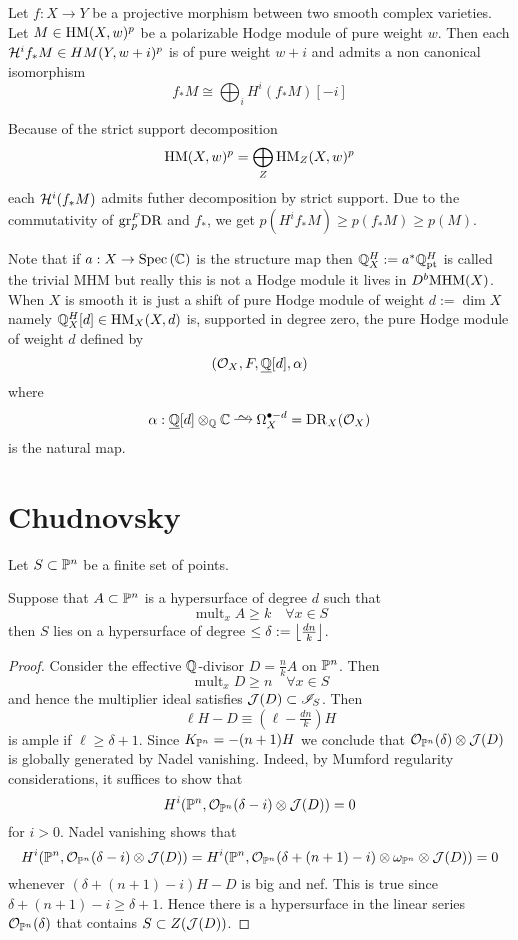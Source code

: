 \documentclass[12pt]{article}
\renewcommand{\gr}{\mathrm{gr}}
\DeclareMathOperator{\mult}{\mathrm{mult}}
\begin{document}
\begin{theorem}
Let $f : X \to Y$ be a projective morphism between two smooth complex varieties. Let $M \in \HM(X, w)^p$ be a polarizable Hodge module of pure weight $w$. Then each $\cH^i f_* M \in HM(Y, w + i)^p$ is of pure weight $w + i$ and admits a non canonical isomorphism
\[ f_* M \cong \bigoplus_i H^i (f_* M) [-i] \]
\end{theorem}

Because of the strict support decomposition
\[ \HM(X, w)^p = \bigoplus_Z \HM_Z(X, w)^p \]
each $\cH^i(f_* M)$ admits futher decomposition by strict support. Due to the commutativity of $\gr^F_p \DR$ and $f_*$, we get $p(H^i f_* M) \ge p(f_* M) \ge p(M)$. 

\begin{rmk}
Note that if $a : X \to \Spec{\CC}$ is the structure map then $\Q^H_X := a^* \Q^H_{\mathrm{pt}}$ is called the trivial MHM but really this is not a Hodge module it lives in $D^b \MHM(X)$. When $X$ is smooth it is just a shift of pure Hodge module of weight $d := \dim{X}$ namely $\Q^H_X[d] \in \HM_X(X, d)$ is, supported in degree zero, the pure Hodge module of weight $d$ defined by
\[ (\struct{X}, F, \ul{\Q}[d], \alpha) \]
where
\[ \alpha : \ul{\Q}[d] \ot_{\Q} \CC \iso \Omega_X^{\bullet-d} = \DR_X(\struct{X}) \]
is the natural map. 
\end{rmk}



\section{Chudnovsky}

Let $S \subset \P^n$ be a finite set of points.

\begin{prop}
Suppose that $A \subset \P^n$ is a hypersurface of degree $d$ such that
\[ \mult_x A \ge k \quad \forall x \in S \]
then $S$ lies on a hypersurface of degree $\le \delta := \floor{\frac{dn}{k}}$.
\end{prop}

\begin{proof}
Consider the effective $\Q$-divisor $D = \tfrac{n}{k} A$ on $\P^n$. Then
\[ \mult_x D \ge n \quad \forall x \in S \]
and hence the multiplier ideal satisfies $\J(D) \subset \I_S$. Then
\[ \ell H - D \equiv (\ell - \tfrac{dn}{k}) H \]
is ample if $\ell \ge \delta + 1$. Since $K_{\P^n} = -(n+1) H$ we conclude that $\struct{\P^n}(\delta) \ot \J(D)$ is globally generated by Nadel vanishing. Indeed,
by Mumford regularity considerations, it suffices to show that
\[ H^i(\P^n, \struct{\P^n}(\delta - i) \ot \J(D)) = 0 \]
for $i > 0$. Nadel vanishing shows that
\[ H^i(\P^n, \struct{\P^n}(\delta - i) \ot \J(D)) = H^i(\P^n, \struct{\P^n}(\delta  + (n+1) - i) \ot \omega_{\P^n} \ot \J(D)) = 0 \]
whenever $(\delta + (n+1) - i) H - D$ is big and nef. This is true since $\delta + (n+1) - i \ge \delta + 1$. Hence there is a hypersurface in the linear series $\struct{\P^n}(\delta)$ that contains $S \subset Z(\J(D)) $. 
\end{proof}
\end{document}
